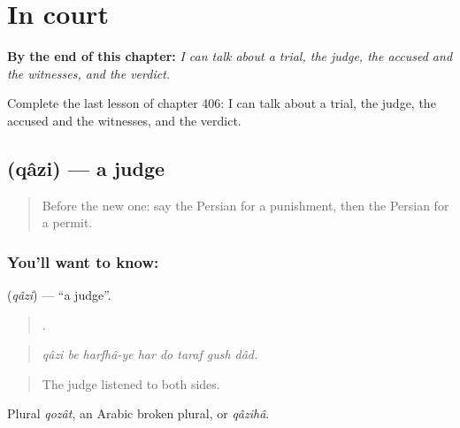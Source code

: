 
\chapter{In court}
\label{ch:fa-in-court}

\begin{chapteropening}
\textbf{By the end of this chapter:} \emph{I can talk about a trial, the judge, the accused and the witnesses, and the verdict.}

Complete the last lesson of chapter 406: I can talk about a trial, the judge, the accused and the witnesses, and the verdict.
\end{chapteropening}

\section[\texorpdfstring{\fa{قاضی} (qâzi)}{قاضی (qâzi)}]{ (qâzi) — a judge}

\label{lesson:FA-C406-qazi}



\begin{quote}
Before the new one: say the Persian for a punishment, then the Persian for a permit.
\end{quote}

\subsection*{You'll want to know: }
\textbf{} (\emph{qâzi}) — \textquotedblleft{}a judge\textquotedblright{}.

\begin{quote}
       .
\end{quote}

\begin{quote}
\emph{qâzi be harfhâ-ye har do taraf gush dâd.}
\end{quote}

\begin{quote}
The judge listened to both sides.
\end{quote}

Plural \emph{qozât}, an Arabic broken plural, or \emph{qâzihâ}.

